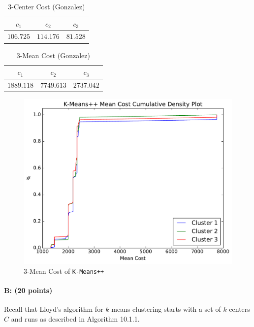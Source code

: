 \documentclass[11pt]{article}
\begin{document}
\begin{table}[H]
\centering
\caption{$3$-Center Cost (Gonzalez)}
\begin{tabular}{c c c}
\hline\hline
$c_{1}$ & $c_{2}$ & $c_{3}$\\
\hline
$106.725$ & $114.176$ & $81.528$\\
\hline
\end{tabular}
\end{table}

\begin{table}[H]
\centering
\caption{$3$-Mean Cost (Gonzalez)}
\begin{tabular}{c c c}
\hline\hline
$c_{1}$ & $c_{2}$ & $c_{3}$\\
\hline
$1889.118$ & $7749.613$ & $2737.042$\\
\hline
\end{tabular}
\end{table}

\begin{figure}[H]
\centering
\includegraphics[width=.75\textwidth]{cdf.pdf}
\caption{ $3$-Mean Cost of {\tt K-Means++}}
\end{figure}

\paragraph{B: (20 points)}
Recall that Lloyd's algorithm for $k$-means clustering starts with a set of $k$ centers $C$ and runs as described in Algorithm 10.1.1.  
\end{document}
